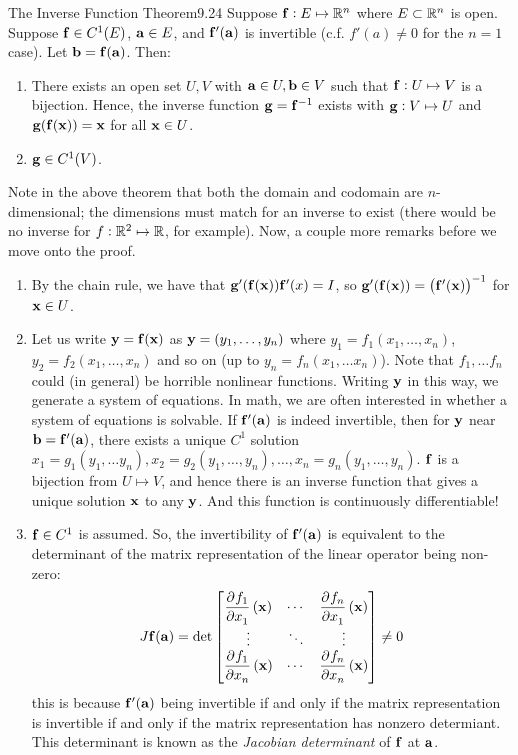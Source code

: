 \setcounter{rudin}{23}
\begin{theorem}{The Inverse Function Theorem}{9.24}
    Suppose $\mathbf{f}: E \mapsto \mathbb{R}^n$ where $E \subset \mathbb{R}^n$ is open. Suppose $\mathbf{f} \in C^1(E)$, $\mathbf{a} \in E$, and $\mathbf{f}'(\mathbf{a})$ is invertible (c.f. $f'(a) \neq 0$ for the $n = 1$ case). Let $\mathbf{b} = \mathbf{f}(\mathbf{a})$. Then:
    \begin{enumerate}[label = (\arabic*)]
        \item There exists an open set $U, V$ with $\mathbf{a} \in U, \mathbf{b} \in V$ such that $\mathbf{f}: U \mapsto V$ is a bijection. Hence, the inverse function $\mathbf{g} = \mathbf{f}^{-1}$ exists with $\mathbf{g}: V \mapsto U$ and $\mathbf{g}(\mathbf{f}(\mathbf{x})) = \mathbf{x}$ for all $\mathbf{x} \in U$.
        \item $\mathbf{g} \in C^1(V)$.
    \end{enumerate}
\end{theorem}
\noindent Note in the above theorem that both the domain and codomain are $n$-dimensional; the dimensions must match for an inverse to exist (there would be no inverse for $f: \mathbb{R}^2 \mapsto \mathbb{R}$, for example). Now, a couple more remarks before we move onto the proof.
\begin{enumerate}[label = \alph*)]
    \item By the chain rule, we have that $\mathbf{g}'(\mathbf{f}(\mathbf{x}))\mathbf{f}'(x) = I$, so $\mathbf{g}'(\mathbf{f}(\mathbf{x})) = \left(\mathbf{f}'(\mathbf{x})\right)^{-1}$ for $\mathbf{x} \in U$.
    \item Let us write $\mathbf{y} = \mathbf{f}(\mathbf{x})$ as $\mathbf{y} = (y_1, \ldots, y_n)$ where $y_1 = f_1(x_1, \ldots, x_n)$, $y_2 = f_2(x_1, \ldots, x_n)$ and so on (up to $y_n = f_n(x_1, \ldots x_n)$). Note that $f_1, \ldots f_n$ could (in general) be horrible nonlinear functions. Writing $\mathbf{y}$ in this way, we generate a system of equations. In math, we are often interested in whether a system of equations is solvable. If $\mathbf{f}'(\mathbf{a})$ is indeed invertible, then for $\mathbf{y}$ near $\mathbf{b} = \mathbf{f}'(\mathbf{a})$, there exists a unique $C^1$ solution $x_1 = g_1(y_1, \ldots y_n), x_2 = g_2(y_1, \ldots, y_n), \ldots, x_n = g_n(y_1, \ldots, y_n)$. $\mathbf{f}$ is a bijection from $U \mapsto V$, and hence there is an inverse function that gives a unique solution $\mathbf{x}$ to any $\mathbf{y}$. And this function is continuously differentiable!
    \item $\mathbf{f} \in C^1$ is assumed. So, the invertibility of $\mathbf{f}'(\mathbf{a})$ is equivalent to the determinant of the matrix representation of the linear operator being non-zero:
    \begin{align*}
        J\v{f}(\v{a}) = \det\m{\dpd{f_1}{x_1}(\v{x}) & \cdots & \dpd{f_n}{x_1}(\v{x})
        \\ \vdots & \ddots & \vdots
        \\ \dpd{f_1}{x_n}(\v{x}) & \cdots & \dpd{f_n}{x_n}(\v{x})} \neq 0
    \end{align*}
    this is because $\mathbf{f}'(\mathbf{a})$ being invertible if and only if the matrix representation is invertible if and only if the matrix representation has nonzero determiant. This determinant is known as the \emph{Jacobian determinant} of $\mathbf{f}$ at $\mathbf{a}$. 
\end{enumerate}

